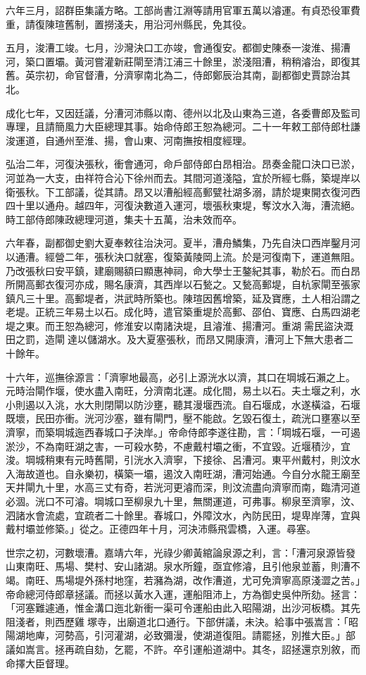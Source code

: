 六年三月，詔群臣集議方略。工部尚書江淵等請用官軍五萬以濬運。有貞恐役軍費重，請復陳瑄舊制，置撈淺夫，用沿河州縣民，免其役。

五月，浚漕工竣。七月，沙灣決口工亦竣，會通復安。都御史陳泰一浚淮、揚漕河，築口置壩。黃河嘗灌新莊閘至清江浦三十餘里，淤淺阻漕，稍稍濬治，即復其舊。英宗初，命官督漕，分濟寧南北為二，侍郎鄭辰治其南，副都御史賈諒治其北。

成化七年，又因廷議，分漕河沛縣以南、德州以北及山東為三道，各委曹郎及監司專理，且請簡風力大臣總理其事。始命侍郎王恕為總河。二十一年敕工部侍郎杜謙浚運道，自通州至淮、揚，會山東、河南撫按相度經理。

弘治二年，河復決張秋，衝會通河，命戶部侍郎白昂相治。昂奏金龍口決口已淤，河並為一大支，由祥符合沁下徐州而去。其間河道淺隘，宜於所經七縣，築堤岸以衛張秋。下工部議，從其請。昂又以漕船經高郵甓社湖多溺，請於堤東開衣復河西四十里以通舟。越四年，河復決數道入運河，壞張秋東堤，奪汶水入海，漕流絕。時工部侍郎陳政總理河道，集夫十五萬，治未效而卒。

六年春，副都御史劉大夏奉敕往治決河。夏半，漕舟鱗集，乃先自決口西岸鑿月河以通漕。經營二年，張秋決口就塞，復築黃陵岡上流。於是河復南下，運道無阻。乃改張秋曰安平鎮，建廟賜額曰顯惠神祠，命大學士王鏊紀其事，勒於石。而白昂所開高郵衣復河亦成，賜名康濟，其西岸以石甃之。又甃高郵堤，自杭家閘至張家鎮凡三十里。高郵堤者，洪武時所築也。陳瑄因舊增築，延及寶應，土人相沿謂之老堤。正統三年易土以石。成化時，遣官築重堤於高郵、邵伯、寶應、白馬四湖老堤之東。而王恕為總河，修淮安以南諸決堤，且濬淮、揚漕河。重湖需民盜決溉田之罰，造閘達以儲湖水。及大夏塞張秋，而昂又開康濟，漕河上下無大患者二十餘年。

十六年，巡撫徐源言：「濟寧地最高，必引上源洸水以濟，其口在堈城石瀨之上。元時治閘作堰，使水盡入南旺，分濟南北運。成化間，易土以石。夫土堰之利，水小則遏以入洮，水大則閉閘以防沙壅，聽其漫堰西流。自石堰成，水遂橫溢，石堰既壞，民田亦衝。洸河沙塞，雖有閘門，壓不能啟。乞毀石復土，疏洸口壅塞以至濟寧，而築堈城迤西春城口子決岸。」帝命侍郎李遂往勘，言：「堈城石堰，一可遏淤沙，不為南旺湖之害，一可殺水勢，不慮戴村壩之衝，不宜毀。近堰積沙，宜浚。堈城稍東有元時舊閘，引洸水入濟寧，下接徐、呂漕河。東平州戴村，則汶水入海故道也。自永樂初，橫築一壩，遏汶入南旺湖，漕河始通。今自分水龍王廟至天井閘九十里，水高三丈有奇，若洸河更濬而深，則汶流盡向濟寧而南，臨清河道必涸。洸口不可濬。堈城口至柳泉九十里，無關運道，可弗事。柳泉至濟寧，汶、泗諸水會流處，宜疏者二十餘里。春城口，外障汶水，內防民田，堤卑岸薄，宜與戴村壩並修築。」從之。正德四年十月，河決沛縣飛雲橋，入運。尋塞。

世宗之初，河數壞漕。嘉靖六年，光祿少卿黃綰論泉源之利，言：「漕河泉源皆發山東南旺、馬場、樊村、安山諸湖。泉水所鐘，亟宜修濬，且引他泉並蓄，則漕不竭。南旺、馬場堤外孫村地窪，若瀦為湖，改作漕道，尤可免濟寧高原淺澀之苦。」帝命總河侍郎章拯議。而拯以黃水入運，運船阻沛上，方為御史吳仲所劾。拯言：「河塞難遽通，惟金溝口迤北新衝一渠可令運船由此入昭陽湖，出沙河板橋。其先阻淺者，則西歷雞塚寺，出廟道北口通行。下部併議，未決。給事中張嵩言：「昭陽湖地庳，河勢高，引河灌湖，必致彌漫，使湖道復阻。請罷拯，別推大臣。」部議如嵩言。拯再疏自劾，乞罷，不許。卒引運船道湖中。其冬，詔拯還京別敘，而命擇大臣督理。

